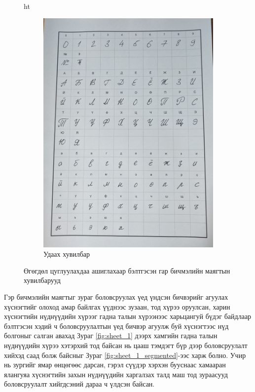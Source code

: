 \begin{figure}{ht}
\begin{subfigure}{0.52\textwidth}
		\includegraphics[width=0.9\linewidth]{images/sheet_2}
		\caption{Удаах хувилбар}
		\label{fig:sheet_2}
	\end{subfigure}
	\caption{Өгөгдөл цуглуулахдаа ашиглахаар бэлтгэсэн гар бичмэлийн маягтын хувилбарууд}
	\label{fig:sheets}
\end{figure}


Гэр бичмэлийн маягтыг зураг боловсруулах үед үндсэн бичвэрийг агуулах хүснэгтийг олоход амар байлгах үүднээс зузаан, тод хүрээ оруулсан, харин хүснэгтийн нүднүүдийн хүрээг гадна талын хүрээнээс харьцангуй бүдэг байдлаар бэлтгэсэн хэдий ч боловсруулалтын үед бичвэр агуулж буй хүснэгтээс нүд болгоныг салган авахад Зураг \ref{fig:sheet_1} дээрх хамгийн гадна талын нүднүүдийн хүрээ хэтэрхий тод байсан нь цааш тэмдэгт бүр дээр боловсруулалт хийхэд саад болж байсныг Зураг \ref{fig:sheet_1_segmented}-ээс харж болно. Учир нь зургийг ямар өнцөгөөс дарсан, гэрэл сүүдэр хэрхэн бууснаас хамааран ялангуяа хүснэгтийн захын нүднүүдийн харгалзах талд маш тод зураасууд боловсруулалт хийгдсэний дараа ч үлдсэн байсан.


